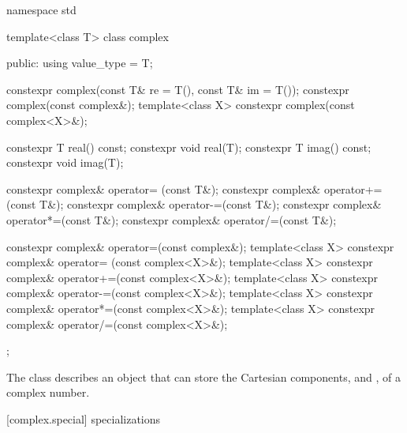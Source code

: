 %
%
\begin{codeblock}
namespace std {
  template<class T> class complex {
  public:
    using value_type = T;

    constexpr complex(const T& re = T(), const T& im = T());
    constexpr complex(const complex&);
    template<class X> constexpr complex(const complex<X>&);

    constexpr T real() const;
    constexpr void real(T);
    constexpr T imag() const;
    constexpr void imag(T);

    constexpr complex& operator= (const T&);
    constexpr complex& operator+=(const T&);
    constexpr complex& operator-=(const T&);
    constexpr complex& operator*=(const T&);
    constexpr complex& operator/=(const T&);

    constexpr complex& operator=(const complex&);
    template<class X> constexpr complex& operator= (const complex<X>&);
    template<class X> constexpr complex& operator+=(const complex<X>&);
    template<class X> constexpr complex& operator-=(const complex<X>&);
    template<class X> constexpr complex& operator*=(const complex<X>&);
    template<class X> constexpr complex& operator/=(const complex<X>&);
  };
}
\end{codeblock}

\pnum
The class
describes an object that can
store the Cartesian components,
and
,
of a complex
number.

[complex.special]{ specializations}

